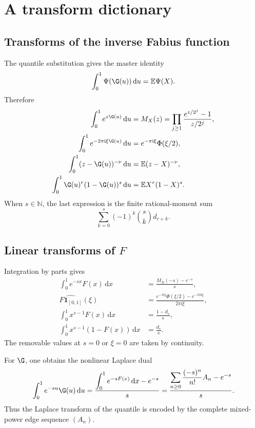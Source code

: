 \documentclass[11pt,oneside]{article}
\theoremstyle{definition}
\theoremstyle{remark}
\newcommand{\F}{F}
\newcommand{\E}{\mathbb E}
\newcommand{\N}{\mathbb N}
\newcommand{\dd}{\,\mathrm d}
\newcommand{\ii}{\mathrm i}
\newcommand{\1}{\mathbf 1}
\begin{document}
\section{A transform dictionary}

\subsection{Transforms of the inverse Fabius function}

The quantile substitution gives the master identity
\begin{equation}\label{p12:eq:quantilepush}
 \int_0^1\Psi(\G(u))\dd u=\E\Psi(X).
\end{equation}
Therefore
\begin{align}
 \int_0^1e^{z\G(u)}\dd u
 &=M_X(z)
 =\prod_{j\ge1}\frac{e^{z/2^j}-1}{z/2^j},\label{p12:eq:Gmgf}\\
 \int_0^1e^{-2\pi\ii\xi\G(u)}\dd u
 &=e^{-\pi\ii\xi}\Phi(\xi/2),\label{p12:eq:Gfourier}\\
 \int_0^1(z-\G(u))^{-\nu}\dd u
 &=\E(z-X)^{-\nu},\label{p12:eq:Gcauchy}\\
 \int_0^1\G(u)^r(1-\G(u))^s\dd u
 &=\E X^r(1-X)^s.\label{p12:eq:Gmixed}
\end{align}
When \(s\in\N\), the last expression is the finite rational-moment sum
\begin{equation}\label{p12:eq:Gmixedfinite}
 \sum_{k=0}^s(-1)^k\binom sk d_{r+k}.
\end{equation}

\subsection{Linear transforms of \(\F\)}

Integration by parts gives
\begin{align}
 \int_0^1e^{-sx}\F(x)\dd x
 &=\frac{M_X(-s)-e^{-s}}s,\label{p12:eq:FLaplace}\\
 \widehat{\F\mathbf1_{[0,1]}}(\xi)
 &=\frac{e^{-\pi\ii\xi}\Phi(\xi/2)-e^{-2\pi\ii\xi}}
 {2\pi\ii\xi},\label{p12:eq:FFourier}\\
 \int_0^1x^{s-1}\F(x)\dd x
 &=\frac{1-d_s}{s},\label{p12:eq:FMellin}\\
 \int_0^1x^{s-1}(1-\F(x))\dd x
 &=\frac{d_s}{s}.\label{p12:eq:survMellin}
\end{align}
The removable values at \(s=0\) or \(\xi=0\) are taken by continuity.

For \(\G\), one obtains the nonlinear Laplace dual
\begin{equation}\label{p12:eq:GLaplace}
 \int_0^1e^{-su}\G(u)\dd u
 =\frac{\displaystyle\int_0^1e^{-s\F(x)}\dd x-e^{-s}}s
 =\frac{\displaystyle\sum_{n\ge0}\frac{(-s)^n}{n!}A_n-e^{-s}}s.
\end{equation}
Thus the Laplace transform of the quantile is encoded by the complete mixed-power
edge sequence \((A_n)\).
\end{document}
